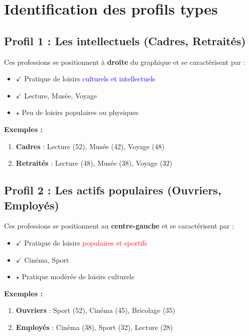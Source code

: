 \documentclass[12pt,a4paper]{book}
\begin{document}
	\section{Identification des profils types}
	
	\subsection{Profil 1 : Les intellectuels (Cadres, Retraités)}
	
	Ces professions se positionnent à \textbf{droite} du graphique et se caractérisent par :
	
	\begin{itemize}
		\item $\checkmark$ Pratique de loisirs \textcolor{blue}{culturels et intellectuels}
		\item $\checkmark$ Lecture, Musée, Voyage
		\item $\star$ Peu de loisirs populaires ou physiques
	\end{itemize}
	
	\textbf{Exemples :}
	\begin{enumerate}
		\item \textbf{Cadres} : Lecture (52), Musée (42), Voyage (48)
		\item \textbf{Retraités} : Lecture (48), Musée (38), Voyage (32)
	\end{enumerate}
	
	\subsection{Profil 2 : Les actifs populaires (Ouvriers, Employés)}
	
	Ces professions se positionnent au \textbf{centre-gauche} et se caractérisent par :
	
	\begin{itemize}
		\item $\checkmark$ Pratique de loisirs \textcolor{red}{populaires et sportifs}
		\item $\checkmark$ Cinéma, Sport
		\item $\star$ Pratique modérée de loisirs culturels
	\end{itemize}
	
	\textbf{Exemples :}
	\begin{enumerate}
		\item \textbf{Ouvriers} : Sport (52), Cinéma (45), Bricolage (35)
		\item \textbf{Employés} : Cinéma (38), Sport (32), Lecture (28)
	\end{enumerate}
	
\end{document}
